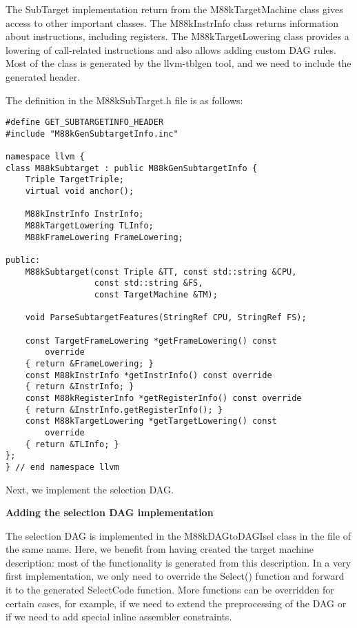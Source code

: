 The SubTarget implementation return from the M88kTargetMachine class gives access to other important classes. The M88kInstrInfo class returns information about instructions, including registers. The M88kTargetLowering class provides a lowering of call-related instructions and also allows adding custom DAG rules. Most of the class is generated by the llvm-tblgen tool, and we need to include the generated header.\par

The definition in the M88kSubTarget.h file is as follows:\par

\begin{lstlisting}[caption={}]
#define GET_SUBTARGETINFO_HEADER
#include "M88kGenSubtargetInfo.inc"

namespace llvm {
class M88kSubtarget : public M88kGenSubtargetInfo {
	Triple TargetTriple;
	virtual void anchor();
	
	M88kInstrInfo InstrInfo;
	M88kTargetLowering TLInfo;
	M88kFrameLowering FrameLowering;
	
public:
	M88kSubtarget(const Triple &TT, const std::string &CPU,
				  const std::string &FS,
				  const TargetMachine &TM);
				  
	void ParseSubtargetFeatures(StringRef CPU, StringRef FS);
	
	const TargetFrameLowering *getFrameLowering() const
		override
	{ return &FrameLowering; }
	const M88kInstrInfo *getInstrInfo() const override
	{ return &InstrInfo; }
	const M88kRegisterInfo *getRegisterInfo() const override
	{ return &InstrInfo.getRegisterInfo(); }
	const M88kTargetLowering *getTargetLowering() const
		override
	{ return &TLInfo; }
};
} // end namespace llvm
\end{lstlisting}

Next, we implement the selection DAG.\par

\hspace*{\fill} \par %
\textbf{Adding the selection DAG implementation}

The selection DAG is implemented in the M88kDAGtoDAGIsel class in the file of the same name. Here, we benefit from having created the target machine description: most of the functionality is generated from this description. In a very first implementation, we only need to override the Select() function and forward it to the generated SelectCode function. More functions can be overridden for certain cases, for example, if we need to extend the preprocessing of the DAG or if we need to add special inline assembler constraints.\par

